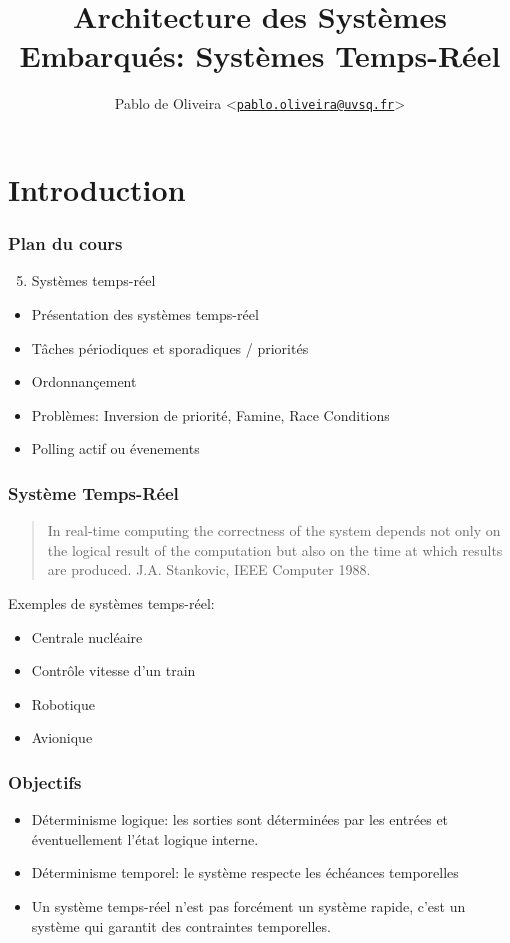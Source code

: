 \documentclass[ignorenonframetext,]{beamer}
\title{Architecture des Systèmes Embarqués: Systèmes Temps-Réel}
\author{Pablo de Oliveira
                \textless{}\href{mailto:pablo.oliveira@uvsq.fr}{\texttt{pablo.oliveira@uvsq.fr}}\textgreater{}}
\begin{document}
\frame{\titlepage}

\section{Introduction}

\begin{frame}\frametitle{Plan du cours}

\begin{enumerate}[1.]
\setcounter{enumi}{4}
\item
  Systèmes temps-réel
\end{enumerate}

\begin{itemize}
\item
  Présentation des systèmes temps-réel
\item
  Tâches périodiques et sporadiques / priorités
\item
  Ordonnançement
\item
  Problèmes: Inversion de priorité, Famine, Race Conditions
\item
  Polling actif ou évenements
\end{itemize}

\end{frame}

\begin{frame}\frametitle{Système Temps-Réel}

\begin{quote}
In real-time computing the correctness of the system depends not only on
the logical result of the computation but also on the time at which
results are produced. J.A. Stankovic, IEEE Computer 1988.
\end{quote}

Exemples de systèmes temps-réel:

\begin{itemize}
\item
  Centrale nucléaire
\item
  Contrôle vitesse d'un train
\item
  Robotique
\item
  Avionique
\end{itemize}

\end{frame}

\begin{frame}\frametitle{Objectifs}

\begin{itemize}
\item
  Déterminisme logique: les sorties sont déterminées par les entrées et
  éventuellement l'état logique interne.
\item
  Déterminisme temporel: le système respecte les échéances temporelles
\item
  Un système temps-réel n'est pas forcément un système rapide, c'est un
  système qui garantit des contraintes temporelles.
\end{itemize}

\end{frame}
\end{document}

